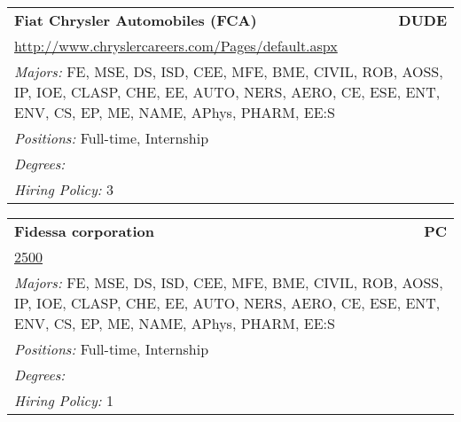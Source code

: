 \documentclass[twoside]{article}
\begin{document}
\begin{center}
\begin{multicols}{3}
\begin{FlushLeft}
\begin{minipage}{.9\columnwidth}\begin{tabularx}{.95\columnwidth}{Xr}
                 {\Large\bf Fiat Chrysler Automobiles (FCA)} & {\Large\bf DUDE}\\
    \multicolumn{2}{p{.95\columnwidth}}{\url{http://www.chryslercareers.com/Pages/default.aspx}}\\
    \multicolumn{2}{p{.95\columnwidth}}{\emph{Majors:} FE, MSE, DS, ISD, CEE, MFE, BME, CIVIL, ROB, AOSS, IP, IOE, CLASP, CHE, EE, AUTO, NERS, AERO, CE, ESE, ENT, ENV, CS, EP, ME, NAME, APhys, PHARM, EE:S}\\
    \multicolumn{2}{p{.95\columnwidth}}{\emph{Positions:} Full-time, Internship}\\
    \multicolumn{2}{p{.95\columnwidth}}{\emph{Degrees:} }\\
    \multicolumn{2}{p{.95\columnwidth}}{\emph{Hiring Policy:} 3}\\
    \end{tabularx}
    
\end{minipage}
 
\begin{minipage}{.9\columnwidth}\begin{tabularx}{.95\columnwidth}{Xr}
                 {\Large\bf Fidessa corporation} & {\Large\bf PC}\\
    \multicolumn{2}{p{.95\columnwidth}}{\url{2500}}\\
    \multicolumn{2}{p{.95\columnwidth}}{\emph{Majors:} FE, MSE, DS, ISD, CEE, MFE, BME, CIVIL, ROB, AOSS, IP, IOE, CLASP, CHE, EE, AUTO, NERS, AERO, CE, ESE, ENT, ENV, CS, EP, ME, NAME, APhys, PHARM, EE:S}\\
    \multicolumn{2}{p{.95\columnwidth}}{\emph{Positions:} Full-time, Internship}\\
    \multicolumn{2}{p{.95\columnwidth}}{\emph{Degrees:} }\\
    \multicolumn{2}{p{.95\columnwidth}}{\emph{Hiring Policy:} 1}\\
    \end{tabularx}
    
\end{minipage}
 

\end{FlushLeft}
\end{multicols}
\end{center}
\end{document}
